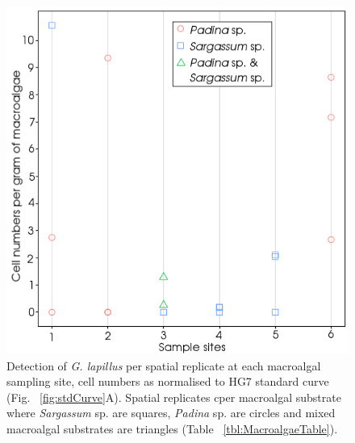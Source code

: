 \documentclass[12pt]{article}
\begin{document}
\begin{figure} 
\includegraphics[scale=.85]{Hero_qpcr-figs/Fig5_Env-sites-May18.png} 
\caption{Detection of \emph{G. lapillus} per spatial replicate at each macroalgal sampling site, cell numbers as normalised to HG7 standard curve (Fig. ~\ref{fig:stdCurve}A). Spatial replicates cper macroalgal substrate where \emph{Sargassum} sp. are squares, \emph{Padina} sp. are circles and mixed macroalgal substrates are triangles (Table ~\ref{tbl:MacroalgaeTable}).} 
\label{fig:envHG7}
\end{figure} 
\FloatBarrier
\FloatBarrier

\newpage
\end{document}

